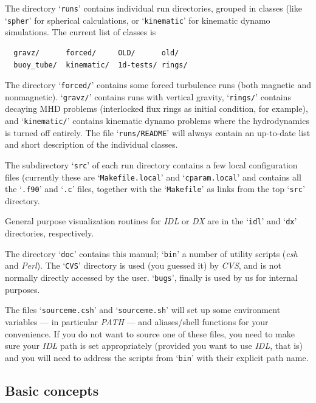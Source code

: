 \documentclass[12pt,twoside,notitlepage,a4paper]{article}
\makeatletter
\newcommand{\var}[1]{\textsl{#1}\index{#1@\emph{#1}}\/}
\newcommand{\file}[1]{`\texttt{#1}'}
\newcommand{\name}[1]{\textsl{#1}\index{#1}\/}
\makeatother
\begin{document}
The directory \file{runs} contains individual run directories, grouped in
classes (like \file{spher} for spherical calculations, or \file{kinematic}
for kinematic dynamo simulations.
The current list of classes is
\begin{verbatim}
  gravz/      forced/     OLD/      old/
  buoy_tube/  kinematic/  1d-tests/ rings/
\end{verbatim}
The directory \file{forced/} contains some forced turbulence runs (both
magnetic and nonmagnetic). 
\file{gravz/} contains runs with vertical gravity, \file{rings/}
contains decaying MHD problems (interlocked flux rings as initial condition, for
example), and \file{kinematic/} contains kinematic dynamo problems where the
hydrodynamics is turned off entirely.
The file \file{runs/README} will always contain an up-to-date list and
short description of the individual classes.

The subdirectory \file{src} of each run directory contains a few local
configuration files (currently these are \file{Makefile.local} and
\file{cparam.local} and contains all the \file{.f90} and \file{.c} files,
together with the \file{Makefile} as links from the top \file{src}
directory.

General purpose visualization routines for \name{IDL} or \name{DX} are in the
\file{idl} and \file{dx} directories, respectively.

The directory \file{doc} contains this manual; \file{bin} a number of
utility scripts (\name{csh} and \name{Perl}).
The \file{CVS} directory is used (you guessed it) by \name{CVS}, and is
not normally directly accessed by the user.
\file{bugs}, finally is used by us for internal purposes.

\bigskip

The files \file{sourceme.csh} and \file{sourceme.sh} will set up some
environment variables --- in particular \var{PATH} --- and aliases/shell
functions for your convenience.
If you do not want to source one of these files, you need to make sure
your \name{IDL} path is set appropriately (provided you want to use
\name{IDL}, that is) and you will need to address the scripts from
\file{bin} with their explicit path name.



\subsection{Basic concepts}
\end{document}
